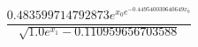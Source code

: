 \documentclass{article}
\begin{document}
\[
\frac{0.483599714792873 e^{x_{0} e^{- 0.449540030640649 x_{0}}}}{\sqrt{1.0 e^{x_{1}} - 0.110959656703588}}
\]
\end{document}
